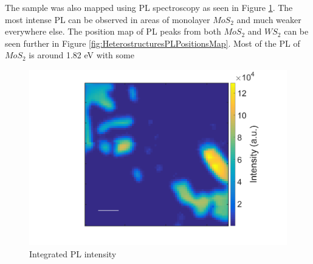 The sample was also mapped using PL spectroscopy as seen in Figure \ref{fig:HeterostructuresPLIntensityMap11}. The most intense PL can be observed in areas of monolayer $MoS_2$ and much weaker everywhere else. The position map of PL peaks from both $MoS_2$ and $WS_2$ can be seen further in Figure \ref{fig:HeterostructuresPLPositionsMap}. Most of the PL of $MoS_2$ is around 1.82 eV with some 

\begin{figure}[h]
	\begin{center}
		\includegraphics[scale=0.3]{Heterostructures/PLIntensityMap11.png}
		\caption{Integrated PL intensity}
		\label{fig:HeterostructuresPLIntensityMap11}
	\end{center}
\end{figure}

